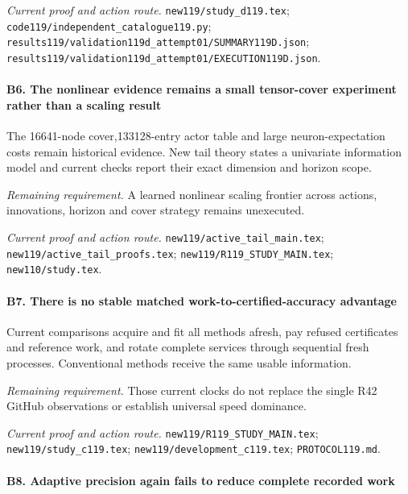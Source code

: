 \par\emph{Current proof and action route.} \nolinkurl{new119/study_d119.tex}; \nolinkurl{code119/independent_catalogue119.py}; \nolinkurl{results119/validation119d_attempt01/SUMMARY119D.json}; \nolinkurl{results119/validation119d_attempt01/EXECUTION119D.json}.

\paragraph{B6. The nonlinear evidence remains a small tensor-cover experiment rather than a scaling result}

The 16641-node cover,133128-entry actor table and large neuron-expectation costs remain historical evidence. New tail theory states a univariate information model and current checks report their exact dimension and horizon scope.

\par\emph{Remaining requirement.} A learned nonlinear scaling frontier across actions, innovations, horizon and cover strategy remains unexecuted.

\par\emph{Current proof and action route.} \nolinkurl{new119/active_tail_main.tex}; \nolinkurl{new119/active_tail_proofs.tex}; \nolinkurl{new119/R119_STUDY_MAIN.tex}; \nolinkurl{new110/study.tex}.

\paragraph{B7. There is no stable matched work-to-certified-accuracy advantage}

Current comparisons acquire and fit all methods afresh, pay refused certificates and reference work, and rotate complete services through sequential fresh processes. Conventional methods receive the same usable information.

\par\emph{Remaining requirement.} Those current clocks do not replace the single R42 GitHub observations or establish universal speed dominance.

\par\emph{Current proof and action route.} \nolinkurl{new119/R119_STUDY_MAIN.tex}; \nolinkurl{new119/study_c119.tex}; \nolinkurl{new119/development_c119.tex}; \nolinkurl{PROTOCOL119.md}.

\paragraph{B8. Adaptive precision again fails to reduce complete recorded work}

